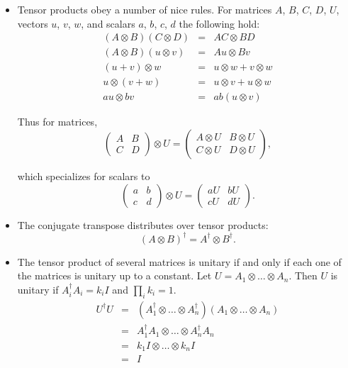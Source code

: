 \documentclass{article}
\def\pagedone{\newpage}
\def\tensor{\otimes}
\begin{document}
\pagedone
\begin{itemize}
		\item Tensor products obey a number of nice rules.
		For matrices $A$, $B$, $C$, $D$, $U$, vectors $u$, $v$, $w$, and scalars $a$, $b$, $c$, $d$ the following hold:
\begin{eqnarray*}
(A \tensor B) (C \tensor D) &=& AC\tensor BD\\
(A \tensor B) (u \tensor v) &=& Au\tensor Bv\\
(u+v)\tensor w&=& u\tensor w + v\tensor w\\
u\tensor(v+w)&=& u\tensor v + u\tensor w\\
au\tensor bv &=& ab(u\tensor v)
\end{eqnarray*}

Thus for matrices,
$$\left(\begin{array}{cc}A & B\\C & D\end{array}\right) \tensor U = 
\left(\begin{array}{cc}A \tensor U & B \tensor U\\C \tensor U & D \tensor U\end{array}\right),$$

which specializes for scalars to
$$\left(\begin{array}{cc}a & b\\c & d\end{array}\right) \tensor U = 
\left(\begin{array}{cc}a U & b U\\c U & d U\end{array}\right).$$

\end{itemize}


\pagedone
\begin{itemize}

	\item The conjugate transpose distributes over tensor products:
$$(A\tensor B)^\dag= A^\dag\tensor B^\dag.$$

	\item The tensor product of several matrices is unitary if and only if each one of the
matrices is unitary up to a constant.  Let $U = A_1\tensor \dots \tensor A_n$.  Then
$U$ is unitary if $A_i^\dag A_i = k_i I$ and $\prod_ik_i = 1$.
\begin{eqnarray*}U^\dag U &=& (A_1^\dag\tensor \dots \tensor A_n^\dag )(A_1\tensor \dots \tensor A_n)\\
&=& A_1^\dag A_1\tensor \dots \tensor A_n^\dag A_n\\
&=& k_1I\tensor \dots \tensor k_nI\\
&=& I\\
\end{eqnarray*}

\end{itemize}
\end{document}
